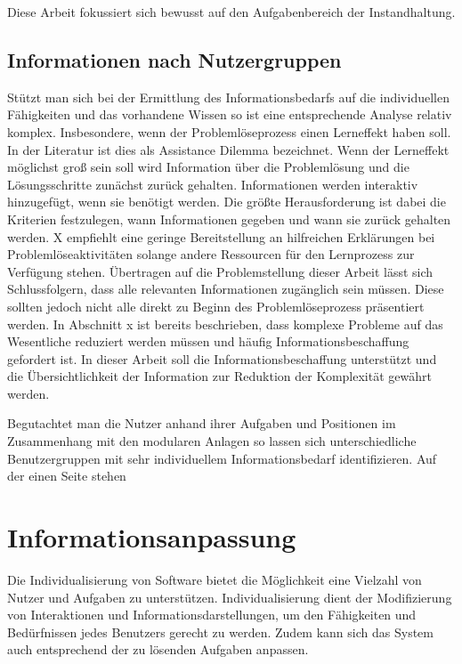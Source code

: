 Diese Arbeit fokussiert sich bewusst auf den Aufgabenbereich der Instandhaltung. 

\subsection{Informationen nach Nutzergruppen}
Stützt man sich bei der Ermittlung des Informationsbedarfs auf die individuellen Fähigkeiten und das vorhandene Wissen so ist eine entsprechende Analyse relativ komplex. Insbesondere, wenn der Problemlöseprozess einen Lerneffekt haben soll. In der Literatur ist dies als Assistance Dilemma bezeichnet. Wenn der Lerneffekt möglichst groß sein soll wird Information über die Problemlösung und die Lösungsschritte zunächst zurück gehalten. Informationen werden interaktiv hinzugefügt, wenn sie benötigt werden. Die größte Herausforderung ist dabei die Kriterien festzulegen, wann Informationen gegeben und wann sie zurück gehalten werden. \cite{}  X empfiehlt eine geringe Bereitstellung an hilfreichen Erklärungen bei Problemlöseaktivitäten solange andere Ressourcen für den Lernprozess zur Verfügung stehen. Übertragen auf die Problemstellung dieser Arbeit lässt sich Schlussfolgern, dass alle relevanten Informationen zugänglich sein müssen. Diese sollten jedoch nicht alle direkt zu Beginn des Problemlöseprozess präsentiert werden. In Abschnitt x ist bereits beschrieben, dass komplexe Probleme auf das Wesentliche reduziert werden müssen und häufig Informationsbeschaffung gefordert ist. In dieser Arbeit soll die Informationsbeschaffung unterstützt und die Übersichtlichkeit der Information zur Reduktion der Komplexität gewährt werden.

Begutachtet man die Nutzer anhand ihrer Aufgaben und Positionen im Zusammenhang mit den modularen Anlagen so lassen sich unterschiedliche Benutzergruppen mit sehr individuellem Informationsbedarf identifizieren. Auf der einen Seite stehen




\section{Informationsanpassung}
Die Individualisierung von Software bietet die Möglichkeit eine Vielzahl von Nutzer und Aufgaben zu unterstützen. Individualisierung dient der Modifizierung von Interaktionen und Informationsdarstellungen, um den Fähigkeiten und Bedürfnissen jedes Benutzers gerecht zu werden. Zudem kann sich das System auch entsprechend der zu lösenden Aufgaben anpassen.

